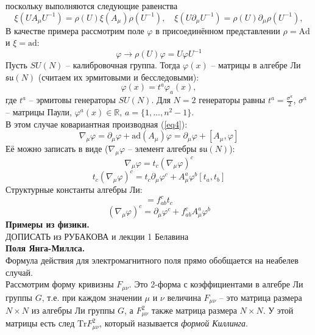 \documentclass[12pt]{article}
\theoremstyle{definition}
\begin{document}
поскольку выполняются следующие равенства
\begin{equation}
    \xi(UA_\mu U^{-1})=\rho(U)\xi(A_\mu)\rho(U^{-1}),\quad \xi(U\partial_\mu U^{-1})=\rho(U)\partial_\mu \rho(U^{-1}),
\end{equation}
В качестве примера рассмотрим поле $\varphi$ в присоединённом представлении $\rho=\text{Ad}$ и $\xi=\text{ad}$:
\begin{equation}
    \varphi\rightarrow\rho(U)\varphi=U\varphi U^{-1}
\end{equation}
Пусть $SU(N)$ -- калибровочная группа. Тогда $\varphi(x)$ -- матрицы в алгебре Ли $\mathfrak{su}(N)$ (считаем их эрмитовыми и бесследовыми):
\begin{equation}
    \varphi(x)=t^a\varphi_a(x),
\end{equation}
где $t^a$ -- эрмитовы генераторы $SU(N)$. Для $N=2$ генераторы равны $t^a=\frac{\sigma^a}{2}$, $\sigma^a$ -- матрицы Паули, $\varphi^a(x)\in\mathbb{R}$, $a=\{1,...,n^2-1\}$.\\
В этом случае ковариантная производная (\ref{eq4}):
\begin{equation}
    \nabla_\mu\varphi=\partial_\mu\varphi+\text{ad}(A_\mu)\varphi=\partial_\mu\varphi+[A_\mu,\varphi]
\end{equation}
Её можно записать в виде ($\nabla_\mu\varphi$ -- элемент алгебры $\mathfrak{su}(N)$):
\begin{equation}
    \nabla_\mu\varphi=t_c(\nabla_\mu\varphi)^c
\end{equation}
\begin{equation}
    t_c(\nabla_\mu\varphi)^c=t_c\partial_\mu\varphi^c+A^a_\mu\varphi^b[t_a,t_b]
\end{equation}
Структурные константы алгебры Ли:
\begin{equation}
    [t_a,t_b]=f^c_{ab}t_c
\end{equation}
\begin{equation}
    (\nabla_\mu\varphi)^c=\partial_\mu\varphi^c+f^c_{ab}A^a_\mu \varphi^b
\end{equation}
\textbf{Примеры из физики.}\\
ДОПИСАТЬ из РУБАКОВА и лекции 1 Белавина\\
\textbf{Поля Янга-Миллса.}\\
Формула действия для электромагнитного поля прямо обобщается
на неабелев случай.\\
Рассмотрим форму кривизны $F_{\mu\nu}$. Это 2-форма с коэффициентами в алгебре Ли группы $G$, т.е. при каждом значении $\mu$ и $\nu$ величина $F_{\mu\nu}$ -- это матрица размера $N\times N$ из алгебры Ли группы $G$, а $F^2_{\mu\nu}$ также матрица размера $N\times N$. У этой матрицы есть след $\text{Tr}F^2_{\mu\nu}$, который называется \textit{формой Киллинга}.\\
\end{document}
